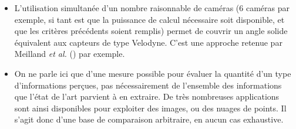 \begin{itemize}
	\item L'utilisation simultanée d'un nombre raisonnable de caméras (6 caméras par exemple, si tant est que la puissance de calcul nécessaire soit disponible, et que les critères précédents soient remplis) permet de couvrir un angle solide équivalent aux capteurs de type \og Velodyne\fg{}. C'est une approche retenue par Meilland \textit{et al.} (\cite{Meilland2011}) par exemple.\\
	
	\item On ne parle ici que d'une mesure possible pour évaluer la quantité d'un type d'informations perçues, pas nécessairement de l'ensemble des informations que l'état de l'art parvient à en extraire. De très nombreuses applications sont ainsi disponibles pour exploiter des images, ou des nuages de points. Il s'agit donc d'une base de comparaison arbitraire, en aucun cas exhaustive.
\end{itemize}

